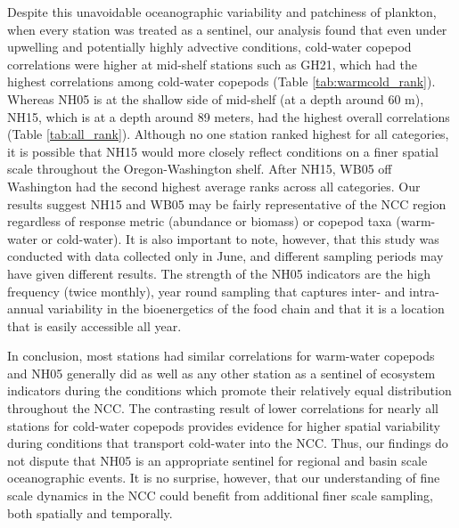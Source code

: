 \documentclass[preprint, authoryear, 12pt]{elsarticle}
\begin{document}
Despite this unavoidable oceanographic variability and patchiness of plankton, when every station was treated as a sentinel, our analysis found that even under upwelling and potentially highly advective conditions, cold-water copepod correlations were higher at mid-shelf stations such as GH21, which had the highest correlations among cold-water copepods (Table \ref{tab:warmcold_rank}). Whereas NH05 is at the shallow side of mid-shelf (at a depth around 60 m), NH15, which is at a depth around 89 meters, had the highest overall correlations (Table \ref{tab:all_rank}).  Although no one station ranked highest for all categories, it is possible that NH15 would more closely reflect conditions on a finer spatial scale throughout the Oregon-Washington shelf. After NH15, WB05 off Washington had the second highest average ranks across all categories. Our results suggest NH15 and WB05 may be fairly representative of the NCC region regardless of response metric (abundance or biomass) or copepod taxa (warm-water or cold-water). It is also important to note, however, that this study was conducted with data collected only in June, and different sampling periods may have given different results. The strength of the NH05 indicators are the high frequency (twice monthly), year round sampling that captures inter- and intra-annual variability in the bioenergetics of the food chain and that it is a location that is easily accessible all year.

In conclusion, most stations had similar correlations for warm-water copepods and NH05 generally did as well as any other station as a sentinel of ecosystem indicators during the conditions which promote their relatively equal distribution throughout the NCC. The contrasting result of lower correlations for nearly all stations for cold-water copepods provides evidence for higher spatial variability during conditions that transport cold-water into the NCC. Thus, our findings do not dispute that NH05 is an appropriate sentinel for regional and basin scale oceanographic events. It is no surprise, however, that our understanding of fine scale dynamics in the NCC could benefit from additional finer scale sampling, both spatially and temporally. 


 
\end{document}
